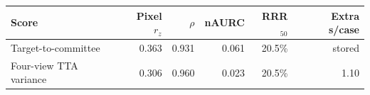 \begin{tabular}{lrrrrr}
\toprule
Score & Pixel $r_z$ & $\rho$ & nAURC & RRR$_{50}$ & Extra s/case \\
\midrule
Target-to-committee & 0.363 & 0.931 & 0.061 & 20.5\% & stored \\ 
Four-view TTA variance & 0.306 & 0.960 & 0.023 & 20.5\% & 1.10 \\ 
\bottomrule
\end{tabular}
